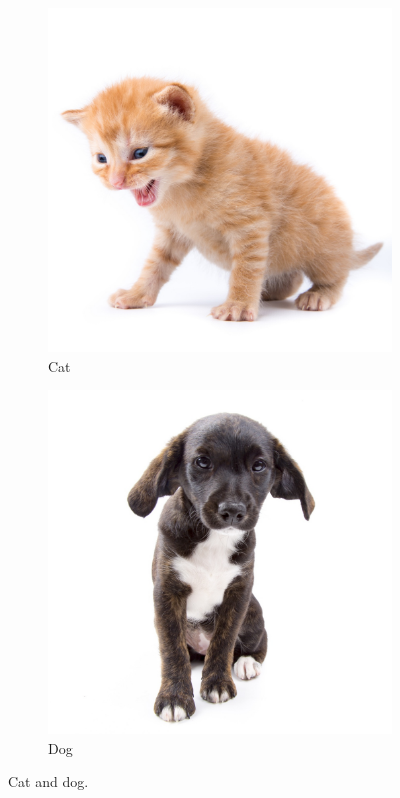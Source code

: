      \begin{figure}
        \centering
        \begin{subfigure}[b]{4cm}
          \includegraphics[width=\textwidth]{img/cat.jpg}
          \caption{Cat}\label{fig:cat}
        \end{subfigure}
        \begin{subfigure}[b]{4cm}
        \includegraphics[width=\textwidth]{img/dog.jpg}
          \caption{Dog}\label{fig:dog}
        \end{subfigure}
        \caption{Cat and dog.}\label{fig:cat-and-dog}
      \end{figure}

